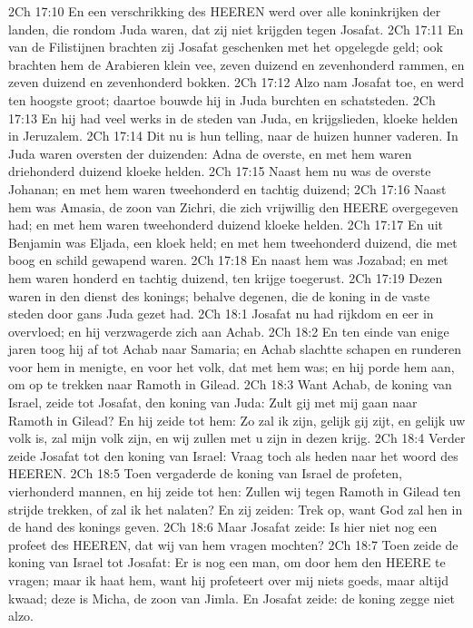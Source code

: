 2Ch 17:10  En een verschrikking des HEEREN werd over alle koninkrijken der landen, die rondom Juda waren, dat zij niet krijgden tegen Josafat.
2Ch 17:11  En van de Filistijnen brachten zij Josafat geschenken met het opgelegde geld; ook brachten hem de Arabieren klein vee, zeven duizend en zevenhonderd rammen, en zeven duizend en zevenhonderd bokken.
2Ch 17:12  Alzo nam Josafat toe, en werd ten hoogste groot; daartoe bouwde hij in Juda burchten en schatsteden.
2Ch 17:13  En hij had veel werks in de steden van Juda, en krijgslieden, kloeke helden in Jeruzalem.
2Ch 17:14  Dit nu is hun telling, naar de huizen hunner vaderen. In Juda waren oversten der duizenden: Adna de overste, en met hem waren driehonderd duizend kloeke helden.
2Ch 17:15  Naast hem nu was de overste Johanan; en met hem waren tweehonderd en tachtig duizend;
2Ch 17:16  Naast hem was Amasia, de zoon van Zichri, die zich vrijwillig den HEERE overgegeven had; en met hem waren tweehonderd duizend kloeke helden.
2Ch 17:17  En uit Benjamin was Eljada, een kloek held; en met hem tweehonderd duizend, die met boog en schild gewapend waren.
2Ch 17:18  En naast hem was Jozabad; en met hem waren honderd en tachtig duizend, ten krijge toegerust.
2Ch 17:19  Dezen waren in den dienst des konings; behalve degenen, die de koning in de vaste steden door gans Juda gezet had.
2Ch 18:1  Josafat nu had rijkdom en eer in overvloed; en hij verzwagerde zich aan Achab.
2Ch 18:2  En ten einde van enige jaren toog hij af tot Achab naar Samaria; en Achab slachtte schapen en runderen voor hem in menigte, en voor het volk, dat met hem was; en hij porde hem aan, om op te trekken naar Ramoth in Gilead.
2Ch 18:3  Want Achab, de koning van Israel, zeide tot Josafat, den koning van Juda: Zult gij met mij gaan naar Ramoth in Gilead? En hij zeide tot hem: Zo zal ik zijn, gelijk gij zijt, en gelijk uw volk is, zal mijn volk zijn, en wij zullen met u zijn in dezen krijg.
2Ch 18:4  Verder zeide Josafat tot den koning van Israel: Vraag toch als heden naar het woord des HEEREN.
2Ch 18:5  Toen vergaderde de koning van Israel de profeten, vierhonderd mannen, en hij zeide tot hen: Zullen wij tegen Ramoth in Gilead ten strijde trekken, of zal ik het nalaten? En zij zeiden: Trek op, want God zal hen in de hand des konings geven.
2Ch 18:6  Maar Josafat zeide: Is hier niet nog een profeet des HEEREN, dat wij van hem vragen mochten?
2Ch 18:7  Toen zeide de koning van Israel tot Josafat: Er is nog een man, om door hem den HEERE te vragen; maar ik haat hem, want hij profeteert over mij niets goeds, maar altijd kwaad; deze is Micha, de zoon van Jimla. En Josafat zeide: de koning zegge niet alzo.
